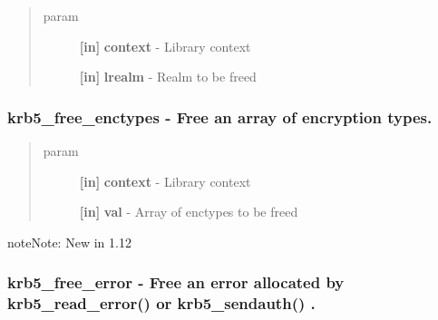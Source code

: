 \documentclass[letterpaper,10pt,english]{sphinxmanual}
\begin{document}
\begin{quote}\begin{description}
\item[{param}] \leavevmode
\textbf{{[}in{]}} \textbf{context} - Library context

\textbf{{[}in{]}} \textbf{lrealm} - Realm to be freed

\end{description}\end{quote}


\subsubsection{krb5\_free\_enctypes -  Free an array of encryption types.}
\label{appdev/refs/api/krb5_free_enctypes::doc}\label{appdev/refs/api/krb5_free_enctypes:krb5-free-enctypes-free-an-array-of-encryption-types}

\begin{fulllineitems}
\label{appdev/refs/api/krb5_free_enctypes:krb5_free_enctypes}
\end{fulllineitems}

\begin{quote}\begin{description}
\item[{param}] \leavevmode
\textbf{{[}in{]}} \textbf{context} - Library context

\textbf{{[}in{]}} \textbf{val} - Array of enctypes to be freed

\end{description}\end{quote}

\begin{notice}{note}{Note:}
New in 1.12
\end{notice}


\subsubsection{krb5\_free\_error -  Free an error allocated by krb5\_read\_error() or krb5\_sendauth() .}
\label{appdev/refs/api/krb5_free_error::doc}\label{appdev/refs/api/krb5_free_error:krb5-free-error-free-an-error-allocated-by-krb5-read-error-or-krb5-sendauth}
\end{document}
